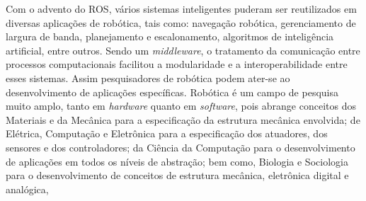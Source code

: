         Com o advento do ROS, vários sistemas inteligentes puderam ser reutilizados em diversas aplicações de robótica, tais como: navegação robótica, gerenciamento de largura de banda, planejamento e escalonamento, algoritmos de inteligência artificial, entre outros. Sendo um \textit{middleware}, o tratamento da comunicação entre processos computacionais facilitou a modularidade e a interoperabilidade entre esses sistemas. Assim pesquisadores de robótica podem ater-se ao desenvolvimento de aplicações específicas. Robótica é um campo de pesquisa muito amplo, tanto em \textit{hardware} quanto em \textit{software}, pois abrange conceitos dos Materiais e da Mecânica para a especificação da estrutura mecânica envolvida; de Elétrica, Computação e Eletrônica para a especificação dos atuadores, dos sensores e dos controladores; da Ciência da Computação para o desenvolvimento de aplicações em todos os níveis de abstração; bem como, Biologia e Sociologia para o desenvolvimento de  conceitos de estrutura mecânica, eletrônica digital e analógica, 
